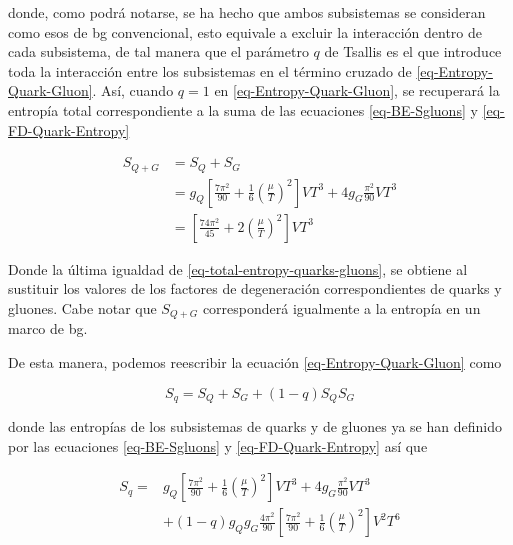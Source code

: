 donde, como podrá notarse, se ha hecho que ambos subsistemas se consideran como esos de \acrshort{bg} convencional, esto equivale a excluir la interacción dentro de cada subsistema, de tal manera que el parámetro $q$ de Tsallis es el que introduce toda la interacción entre los subsistemas en el término cruzado de \eqref{eq-Entropy-Quark-Gluon}. Así, cuando $q=1$ en \eqref{eq-Entropy-Quark-Gluon}, se recuperará la entropía total correspondiente a la suma de las ecuaciones \eqref{eq-BE-Sgluons} y \eqref{eq-FD-Quark-Entropy}

\begin{equation}\label{eq-total-entropy-quarks-gluons}
\begin{split}
{S}_{Q+G} & = {S}_{Q} +{S}_{G} \\
& = {g}_{Q} \left[ \frac{7{\pi}^{2}}{90} + \frac{1}{6} \left(\frac{\mu}{T} \right)^{2}\right] V{T}^{3} + 4{g}_{G} \frac{{\pi}^{2}}{90} V{T}^{3} \\
& = \left[\frac{74{\pi}^{2}}{45} + 2 \left(\frac{\mu}{T} \right)^{2} \right]V{T}^{3}
\end{split}
\end{equation}

Donde la última igualdad de \eqref{eq-total-entropy-quarks-gluons}, se obtiene al sustituir los valores de los factores de degeneración correspondientes de quarks y gluones. Cabe notar que ${S}_{Q+G}$ corresponderá igualmente a la entropía en un marco de \acrshort{bg}. 

De esta manera, podemos reescribir la ecuación \eqref{eq-Entropy-Quark-Gluon} como

\begin{equation} 
{S}_{q} = {S}_{Q} + {S}_{G} + (1-q) {S}_{Q}{S}_{G}
\end{equation}

donde las entropías de los subsistemas de quarks y de gluones ya se han definido por las ecuaciones  \eqref{eq-BE-Sgluons} y \eqref{eq-FD-Quark-Entropy} así que 

\begin{equation}
\begin{split}
{S}_{q} = & {g}_{Q} \left[\frac{7{\pi}^{2}}{90} + \frac{1}{6} \left(\frac{\mu}{T} \right)^{2} \right] V{T}^{3} + 4{g}_{G} \frac{{\pi}^{2}}{90} V {T}^{3} \\
& + \left(1-q \right) {g}_{Q}{g}_{G} \frac{4{\pi}^{2}}{90} \left[\frac{7{\pi}^{2}}{90} + \frac{1}{6} \left(\frac{\mu}{T} \right)^{2}\right]{V}^{2}{T}^{6}
\end{split}
\end{equation}

